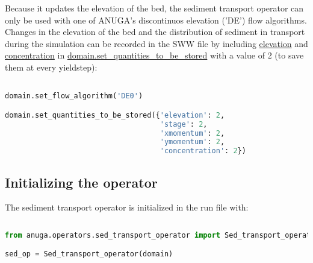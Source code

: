\documentclass[10pt]{article}
\begin{document}
Because it updates the elevation of the bed, the sediment transport operator can only be used with one of ANUGA's discontinuos elevation ('DE') flow algorithms. Changes in the elevation of the bed and the distribution of sediment in transport during the simulation can be recorded in the SWW file by including \url{elevation} and \url{concentration} in \url{domain.set_quantities_to_be_stored} with a value of 2 (to save them at every yieldstep):

\begin{minipage}[c]{0.95\textwidth}
\begin{lstlisting}[language=Python, title=Setting the flow algorithm and recording the output]

domain.set_flow_algorithm('DE0')

domain.set_quantities_to_be_stored({'elevation': 2,
                                    'stage': 2,
                                    'xmomentum': 2,
                                    'ymomentum': 2,
                                    'concentration': 2})

\end{lstlisting}
\end{minipage}

\subsection{Initializing the operator}

The sediment transport operator is initialized in the run file with:

\begin{minipage}[c]{0.95\textwidth}
\begin{lstlisting}[language=Python, title=Initializing the sediment transport operator]
 
from anuga.operators.sed_transport_operator import Sed_transport_operator

sed_op = Sed_transport_operator(domain)

\end{lstlisting}
\end{minipage}
\ \\
\end{document}
